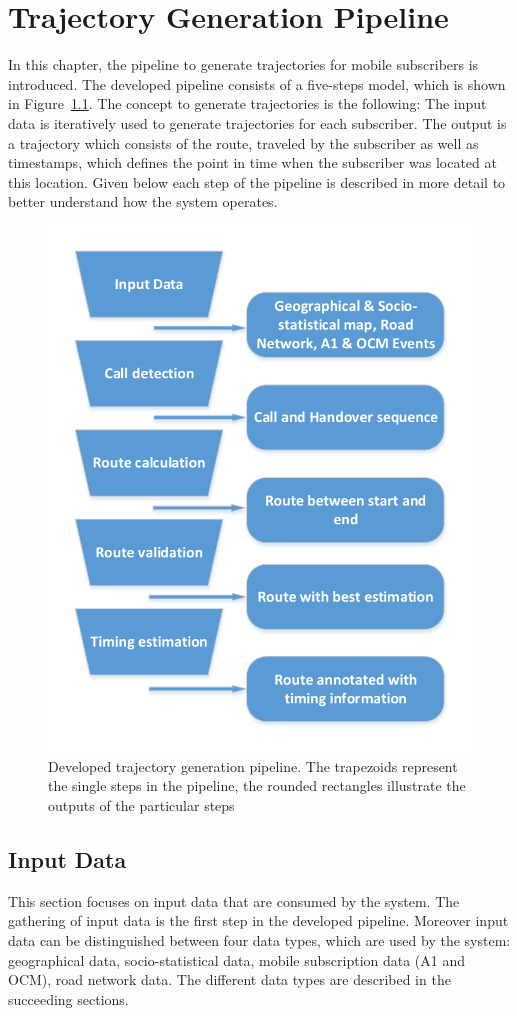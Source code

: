 \documentclass[master,english]{hgbthesis}
\begin{document}
\chapter{Trajectory Generation Pipeline}
\label{cha:concepts}
In this chapter, the pipeline to generate trajectories for mobile subscribers is introduced. The developed pipeline consists of a five-steps model, which is shown in Figure~\ref{fig:pipeline}. The concept to generate trajectories is the following: The input data is iteratively used to generate trajectories for each subscriber. The output is a trajectory which consists of the route, traveled by the subscriber as well as timestamps, which defines the point in time when the subscriber was located at this location. Given below each step of the pipeline is described in more detail to better understand how the system operates.
\begin{figure}
	\centering
	\includegraphics[width=0.7\linewidth]{./images/pipeline}
	\caption{Developed trajectory generation pipeline. The trapezoids represent the single steps in the pipeline, the rounded rectangles illustrate the
	outputs of the particular steps}
	\label{fig:pipeline}
\end{figure}
\section{Input Data}
This section focuses on input data that are consumed by the system. The gathering of input data is the first step in the developed pipeline. Moreover input data can be distinguished between four data types, which are used by the system: geographical data, socio-statistical data, mobile subscription data (A1 and OCM), road network data. The different data types are described in the succeeding sections.
\end{document}
